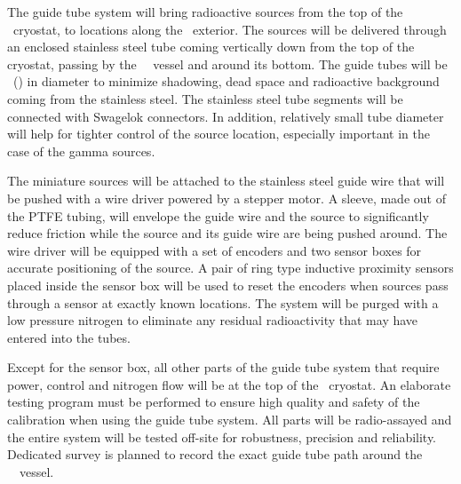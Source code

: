 The guide tube system will bring radioactive sources from the top of the \AAr\ cryostat, to locations along the \TPC\ exterior. The sources will be delivered through an enclosed stainless steel tube coming vertically down from the top of the cryostat, passing by the \TPC\ \PMMA\ vessel and around its bottom. The guide tubes will be \CalGuideTubeDiameter\ (\CalGuideTubeDiameterInches) in diameter to minimize shadowing, dead space and radioactive background coming from the stainless steel. The stainless steel tube segments will be connected with Swagelok connectors. In addition, relatively small tube diameter will help for tighter control of the source location, especially important in the case of the gamma sources. 

The miniature sources will be attached to the stainless steel guide wire that will be pushed with a wire driver powered by a stepper motor. A sleeve, made out of the PTFE tubing, will envelope the guide wire and the source to significantly reduce friction while the source and its guide wire are being pushed around. The wire driver will be equipped with a set of encoders and two sensor boxes for accurate positioning of the source. A pair of ring type inductive proximity sensors placed inside the sensor box will be used to reset the encoders when sources pass through a sensor at exactly known locations. The system will be purged with a low pressure nitrogen to eliminate any residual radioactivity that may have entered into the tubes.

Except for the sensor box, all other parts of the guide tube system that require power, control and nitrogen flow will be at the top of the \AAr\ cryostat.  An elaborate testing program must be performed to ensure high quality and safety of the calibration when using the guide tube system. All parts will be radio-assayed and the entire system will be tested off-site for robustness, precision and reliability. Dedicated survey is planned to record the exact guide tube path around the \TPC\ \PMMA\ vessel.
